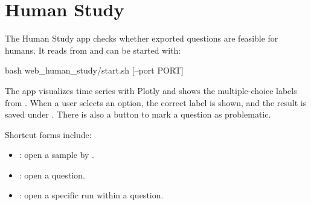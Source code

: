 \documentclass[11pt]{article}
\begin{document}
\section*{Human Study}
The Human Study app checks whether exported questions are feasible for humans.
It reads from  and can be started with:

\begin{DocCode}
bash web_human_study/start.sh [--port PORT]
\end{DocCode}

The app visualizes time series with Plotly and shows the multiple-choice labels from .
When a user selects an option, the correct label is shown, and the result is saved under .
There is also a button to mark a question as problematic.

Shortcut forms include:

\begin{itemize}
\item {}: open a sample by \termRunID.
\item {}: open a question.
\item {}: open a specific run within a question.
\end{itemize}
\end{document}
